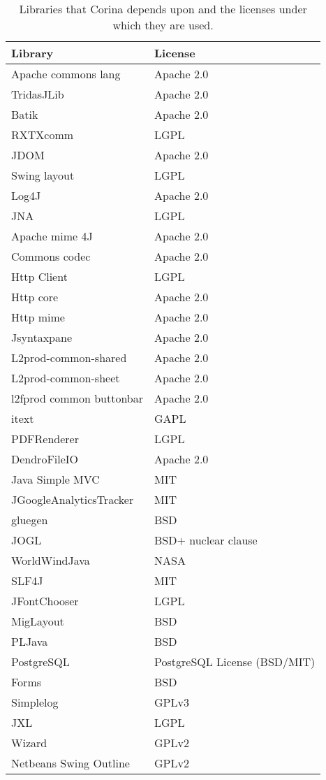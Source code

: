 \begin{table*}[htbp]
\centering
{}
\begin{tabular*}{0.6\textwidth}{ll}
\toprule
Library & License \\
\midrule
Apache commons lang & Apache 2.0 \\
TridasJLib & Apache 2.0 \\
Batik & Apache 2.0 \\ 
RXTXcomm & LGPL\\
JDOM & Apache 2.0\\
Swing layout & LGPL\\
Log4J & Apache 2.0\\
JNA & LGPL\\
Apache mime 4J & Apache 2.0\\
Commons codec & Apache 2.0\\
Http Client &LGPL\\
Http core & Apache 2.0\\
Http mime &Apache 2.0\\
Jsyntaxpane & Apache 2.0\\
L2prod-common-shared &Apache 2.0\\
L2prod-common-sheet &Apache 2.0\\
l2fprod common buttonbar &Apache 2.0\\
itext &GAPL\\
PDFRenderer & LGPL\\
DendroFileIO & Apache 2.0\\
Java Simple MVC & MIT\\
JGoogleAnalyticsTracker & MIT\\
gluegen & BSD\\
JOGL & BSD+ nuclear clause\\
WorldWindJava & NASA \\
SLF4J & MIT\\
JFontChooser & LGPL\\
MigLayout & BSD\\
PLJava & BSD\\
PostgreSQL & PostgreSQL License (BSD/MIT)\\
Forms & BSD\\
Simplelog & GPLv3\\
JXL & LGPL\\
Wizard & GPLv2\\
Netbeans Swing Outline & GPLv2\\
\bottomrule
\end{tabular*}
\captionsetup{width=0.6\textwidth}
\caption{Libraries that Corina depends upon and the licenses under which they are used.}
\label{tbl:desktopDependencies}
\end{table*}


